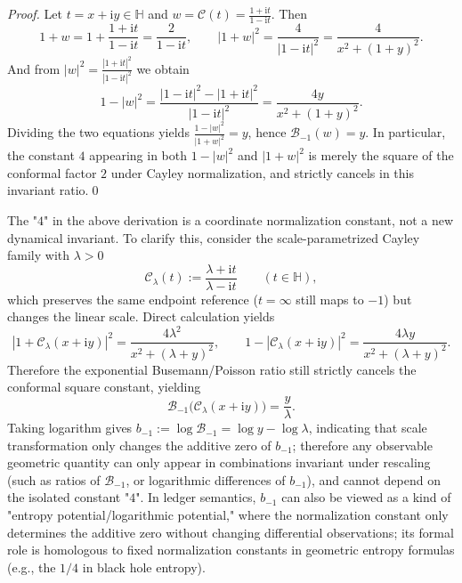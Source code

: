 \begin{proof}
Let \(t=x+\mathrm{i}y\in\mathbb{H}\) and \(w=\mathcal{C}(t)=\frac{1+\mathrm{i}t}{1-\mathrm{i}t}\).
Then
\[
1+w
=1+\frac{1+\mathrm{i}t}{1-\mathrm{i}t}
=\frac{2}{1-\mathrm{i}t},
\qquad
|1+w|^2=\frac{4}{|1-\mathrm{i}t|^2}=\frac{4}{x^2+(1+y)^2}.
\]
And from
\(
|w|^2=\frac{|1+\mathrm{i}t|^2}{|1-\mathrm{i}t|^2}
\)
we obtain
\[
1-|w|^2
=\frac{|1-\mathrm{i}t|^2-|1+\mathrm{i}t|^2}{|1-\mathrm{i}t|^2}
=\frac{4y}{x^2+(1+y)^2}.
\]
Dividing the two equations yields \(\frac{1-|w|^2}{|1+w|^2}=y\), hence \(\mathcal{B}_{-1}(w)=y\).
In particular, the constant \(4\) appearing in both \(1-|w|^2\) and \(|1+w|^2\) is merely the square of the conformal factor \(2\) under Cayley normalization, and strictly cancels in this invariant ratio.\qed
\end{proof}

\begin{remark}\label{rem:dephys-cayley-scale-gauge-four}
The "\(4\)" in the above derivation is a coordinate normalization constant, not a new dynamical invariant.
To clarify this, consider the scale-parametrized Cayley family with \(\lambda>0\)
\[
\mathcal{C}_{\lambda}(t):=\frac{\lambda+\mathrm{i}t}{\lambda-\mathrm{i}t}\qquad(t\in\mathbb{H}),
\]
which preserves the same endpoint reference (\(t=\infty\) still maps to \(-1\)) but changes the linear scale.
Direct calculation yields
\[
|1+\mathcal{C}_{\lambda}(x+\mathrm{i}y)|^2
=\frac{4\lambda^2}{x^2+(\lambda+y)^2},
\qquad
1-|\mathcal{C}_{\lambda}(x+\mathrm{i}y)|^2
=\frac{4\lambda y}{x^2+(\lambda+y)^2}.
\]
Therefore the exponential Busemann/Poisson ratio still strictly cancels the conformal square constant, yielding
\[
\mathcal{B}_{-1}\!\bigl(\mathcal{C}_{\lambda}(x+\mathrm{i}y)\bigr)=\frac{y}{\lambda}.
\]
Taking logarithm gives \(b_{-1}:=\log\mathcal{B}_{-1}=\log y-\log\lambda\), indicating that scale transformation only changes the additive zero of \(b_{-1}\);
therefore any observable geometric quantity can only appear in combinations invariant under rescaling (such as ratios of \(\mathcal{B}_{-1}\), or logarithmic differences of \(b_{-1}\)), and cannot depend on the isolated constant "\(4\)".
In ledger semantics, \(b_{-1}\) can also be viewed as a kind of "entropy potential/logarithmic potential," where the normalization constant only determines the additive zero without changing differential observations; its formal role is homologous to fixed normalization constants in geometric entropy formulas (e.g., the \(1/4\) in black hole entropy).
\end{remark}

